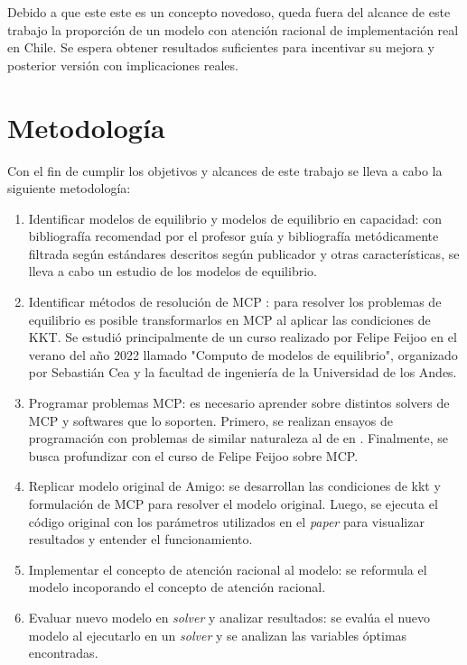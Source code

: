 Debido a que este este es un concepto novedoso, queda fuera del alcance de este trabajo la proporción de un modelo con atención racional de implementación real en Chile. Se espera obtener resultados suficientes para incentivar su mejora y posterior versión con implicaciones reales.

\section{Metodología}
Con el fin de cumplir los objetivos y alcances de este trabajo se lleva a cabo la siguiente metodología:

\begin{enumerate}
\item Identificar modelos de equilibrio y modelos de equilibrio en capacidad: con bibliografía recomendad por el profesor guía y bibliografía metódicamente filtrada según estándares descritos según publicador y otras características, se lleva a cabo un estudio de los modelos de equilibrio.

\item Identificar métodos de resolución de MCP : para resolver los problemas de equilibrio es posible transformarlos en MCP al aplicar las condiciones de KKT. Se estudió principalmente de un curso realizado por Felipe Feijoo en el verano del año 2022 llamado "Computo de modelos de equilibrio", organizado por Sebastián Cea y la facultad de ingeniería de la Universidad de los Andes.   

\item Programar problemas MCP: es necesario aprender sobre distintos solvers de MCP y softwares que lo soporten. Primero, se realizan ensayos de programación con problemas de similar naturaleza al de  en . Finalmente, se busca profundizar con el curso de Felipe Feijoo sobre MCP. 

\item Replicar modelo original de Amigo: se desarrollan las condiciones de kkt y formulación de MCP para resolver el modelo original. Luego, se ejecuta el código original con los parámetros utilizados en el \textit{paper} para visualizar resultados y entender el funcionamiento.

\item Implementar el concepto de atención racional al modelo: se reformula el modelo incoporando el concepto de atención racional.

\item Evaluar nuevo modelo en \textit{solver} y analizar resultados: se evalúa el nuevo modelo al ejecutarlo en un \textit{solver} y se analizan las variables óptimas encontradas.
\end{enumerate}


